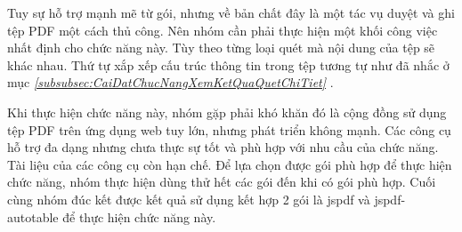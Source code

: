 Tuy sự hỗ trợ mạnh mẽ từ gói, nhưng về bản chất đây là một tác vụ duyệt và ghi tệp PDF một cách thủ công.
Nên nhóm cần phải thực hiện một khối công việc nhất định cho chức năng này.
Tùy theo từng loại quét mà nội dung của tệp sẽ khác nhau.
Thứ tự xắp xếp cấu trúc thông tin trong tệp tương tự như đã nhắc ở mục \textit{\ref{subsubsec:CaiDatChucNangXemKetQuaQuetChiTiet} }.

Khi thực hiện chức năng này, nhóm gặp phải khó khăn đó là cộng đồng sử dụng tệp PDF trên ứng dụng web tuy lớn, nhưng phát triển không mạnh. Các công cụ hỗ trợ đa dạng nhưng chưa thực sự tốt và phù hợp với nhu cầu của chức năng. Tài liệu của các công cụ còn hạn chế. Để lựa chọn được gói phù hợp để thực hiện chức năng, nhóm thực hiện dùng thử hết các gói đến khi có gói phù hợp. Cuối cùng nhóm đúc kết được kết quả sử dụng kết hợp 2 gói là jspdf và jspdf-autotable để thực hiện chức năng này.